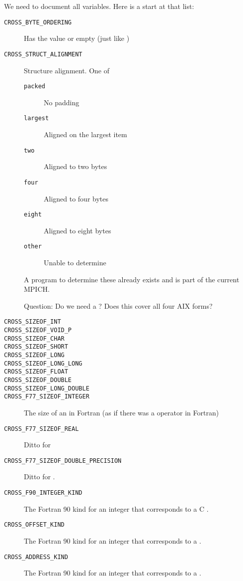 \documentclass{article}
\begin{document}
We need to document all  variables.  Here is a start at that
list:
\begin{description}
\item[\texttt{CROSS_BYTE_ORDERING}]Has the value  or
  empty (just like )
\item[\texttt{CROSS_STRUCT_ALIGNMENT}]Structure alignment.  One of 
    \begin{description}
    \item[\texttt{packed}]No padding
    \item[\texttt{largest}]Aligned on the largest item
    \item[\texttt{two}]Aligned to two bytes
    \item[\texttt{four}]Aligned to four bytes
    \item[\texttt{eight}]Aligned to eight bytes
    \item[\texttt{other}]Unable to determine
    \end{description}
    A program to determine these already exists and is part of the
    current MPICH.

    Question: Do we need a ?  Does this cover all four AIX forms?
\item[\texttt{CROSS_SIZEOF_INT}]
\item[\texttt{CROSS_SIZEOF_VOID_P}]
\item[\texttt{CROSS_SIZEOF_CHAR}]
\item[\texttt{CROSS_SIZEOF_SHORT}]
\item[\texttt{CROSS_SIZEOF_LONG}]
\item[\texttt{CROSS_SIZEOF_LONG_LONG}]
\item[\texttt{CROSS_SIZEOF_FLOAT}]
\item[\texttt{CROSS_SIZEOF_DOUBLE}]
\item[\texttt{CROSS_SIZEOF_LONG_DOUBLE}]
\item[\texttt{CROSS_F77_SIZEOF_INTEGER}]The size of an  in
  Fortran (as if there was a  operator in Fortran)
\item[\texttt{CROSS_F77_SIZEOF_REAL}]Ditto for 
\item[\texttt{CROSS_F77_SIZEOF_DOUBLE_PRECISION}]Ditto for
.
\item[\texttt{CROSS_F90_INTEGER_KIND}]The Fortran 90 kind for an integer that
  corresponds to a C .
\item[\texttt{CROSS_OFFSET_KIND}]The Fortran 90 kind for an integer that
  corresponds to a .
\item[\texttt{CROSS_ADDRESS_KIND}]The Fortran 90 kind for an integer that
  corresponds to a .
\end{description}
\end{document}
